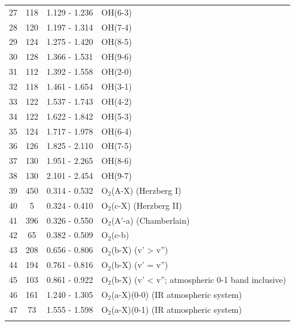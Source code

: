 \begin{table}
\begin{tabular}{c c c l}
27 & 118 & 1.129 - 1.236 & OH(6-3) \\
28 & 120 & 1.197 - 1.314 & OH(7-4) \\
29 & 124 & 1.275 - 1.420 & OH(8-5) \\
30 & 128 & 1.366 - 1.531 & OH(9-6) \\
31 & 112 & 1.392 - 1.558 & OH(2-0) \\
32 & 118 & 1.461 - 1.654 & OH(3-1) \\
33 & 122 & 1.537 - 1.743 & OH(4-2) \\
34 & 122 & 1.622 - 1.842 & OH(5-3) \\
35 & 124 & 1.717 - 1.978 & OH(6-4) \\
36 & 126 & 1.825 - 2.110 & OH(7-5) \\
37 & 130 & 1.951 - 2.265 & OH(8-6) \\
38 & 130 & 2.101 - 2.454 & OH(9-7) \\
39 & 450 & 0.314 - 0.532 & O$_2$(A-X) (Herzberg I) \\
40 &   5 & 0.324 - 0.410 & O$_2$(c-X) (Herzberg II) \\
41 & 396 & 0.326 - 0.550 & O$_2$(A'-a) (Chamberlain) \\
42 &  65 & 0.382 - 0.509 & O$_2$(c-b) \\
43 & 208 & 0.656 - 0.806 & O$_2$(b-X) (v' > v'') \\
44 & 194 & 0.761 - 0.816 & O$_2$(b-X) (v' = v'') \\
45 & 103 & 0.861 - 0.922 & O$_2$(b-X) (v' < v''; atmospheric 0-1 band
                           inclusive) \\
46 & 161 & 1.240 - 1.305 & O$_2$(a-X)(0-0) (IR atmospheric system) \\
47 &  73 & 1.555 - 1.598 & O$_2$(a-X)(0-1) (IR atmospheric system) \\
\noalign{\smallskip}
\hline
\end{tabular}
\end{table}

